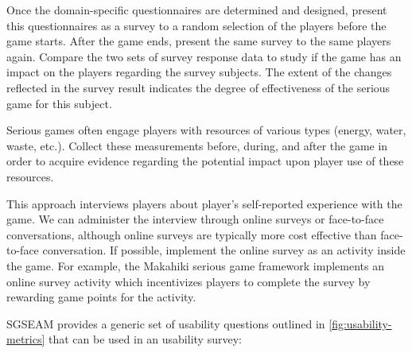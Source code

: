 Once the domain-specific questionnaires are determined and designed, present this questionnaires as a 
survey to a random selection of the players before the game starts. After the game ends, present the same 
survey to the same players again. Compare the two sets of survey response data to study if the game has an 
impact on the players regarding the survey subjects. The extent of the changes reflected in the survey 
result indicates the degree of effectiveness of the serious game for this subject.

Serious games often engage players with resources of various types (energy, water, waste, etc.). Collect 
these measurements before, during, and after the game in order to acquire evidence regarding the potential 
impact upon player use of these resources.

\label{Self-reported usability survey}

This approach interviews players about player's self-reported experience with the game. We can administer the interview through online surveys or face-to-face conversations, although online surveys are typically more 
cost effective than face-to-face conversation. If possible, implement the online survey as an activity inside the 
game. For example, the Makahiki serious game framework implements an online survey activity which 
incentivizes players to complete the survey by rewarding game points for the activity.

SGSEAM provides a generic set of usability questions outlined in \autoref{fig:usability-metrics} that can be used in an usability survey:\\

